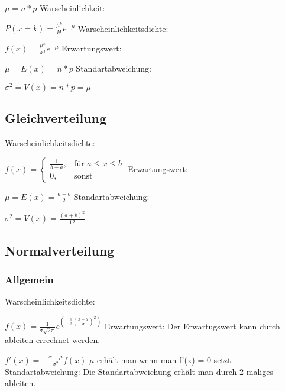 \documentclass[a4paper, 11pt]{article}
\begin{document}
$\mu = n * p$
\newline\newline Warscheinlichkeit:

$P(x=k) = \frac{\mu^k} {k!} e^{-\mu}$
\newline\newline Warscheinlichkeitsdichte:

$f(x) = \frac{\mu^x} {x!} e^{-\mu}$
\newline\newline Erwartungswert:

$\mu = E(x) = n * p$
\newline\newline Standartabweichung:

$\sigma^2 = V(x)= n * p = \mu $
\subsection{Gleichverteilung}
Warscheinlichkeitsdichte:

$f(x) = \begin {cases}
  \frac{1} {b-a}, & \text {für } a\le x \le b \\
  0, & \text{sonst}
\end{cases} $
\newline\newline Erwartungswert:

$ \mu = E(x) = \frac { a + b } {2}$
\newline\newline Standartabweichung:

$\sigma^2 = V(x)= \frac {(a + b)^2 } {12} $
\subsection{Normalverteilung}

\subsubsection{Allgemein}
Warscheinlichkeitsdichte: 

$f(x) = \frac{1} {\sigma \sqrt{2\pi}} e^{(-\frac{1}{2}(\frac{x-\mu}{\sigma})^2)}$
\newline\newline Erwartungswert:
\newline Der Erwartugswert kann durch ableiten errechnet werden.

$f'(x) = -\frac{x-\mu} {\sigma^2} f(x)$
$\mu$ erhält man wenn man f'(x) = 0 setzt.
\newline\newline Standartabweichung:
\newline Die Standartabweichung erhält man durch 2 maliges ableiten.
\end{document}
